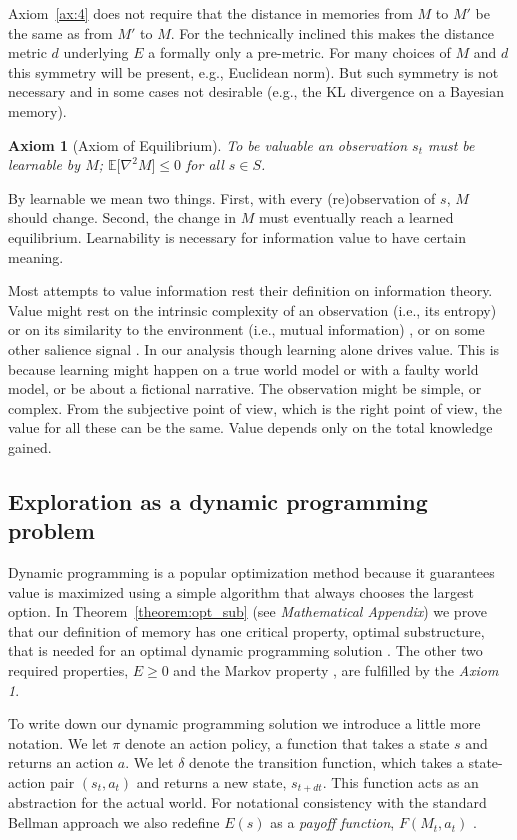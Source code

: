 \documentclass[fleqn,10pt]{wlscirep}
\newtheorem{axiom}{Axiom}
\begin{document}
Axiom~\ref{ax:4} does not require that the distance in memories from $M$ to $M'$ be the same as from $M'$ to $M$. For the technically inclined this makes the distance metric $d$ underlying $E$ a formally only a pre-metric. For many choices of $M$ and $d$ this symmetry will be present, e.g., Euclidean norm). But such symmetry is not necessary and in some cases not desirable (e.g., the KL divergence on a Bayesian memory).

\begin{axiom}
	[Axiom of Equilibrium] To be valuable an observation $s_t$ must be learnable by $M$; $\mathbb{E}\big [\nabla^2 M \big ] \leq 0$ for all $s \in S$. 
\label{ax:5} 
\end{axiom}
\noindent By learnable we mean two things. First, with every (re)observation of $s$, $M$ should change. Second, the change in $M$ must eventually reach a learned equilibrium. Learnability is necessary for information value to have certain meaning. 

Most attempts to value information rest their definition on information theory. Value might rest on the intrinsic complexity of an observation (i.e., its entropy) \cite{Haarnoja2018} or on its similarity to the environment (i.e., mutual information) \cite{Kolchinsky2018}, or on some other salience signal \cite{Tishby2000}. In our analysis though learning alone drives value. This is because learning might happen on a true world model or with a faulty world model, or be about a fictional narrative. The observation might be simple, or complex. From the subjective point of view, which is the right point of view, the value for all these can be the same. Value depends only on the total knowledge gained.

\subsection*{Exploration as a dynamic programming problem} Dynamic programming is a popular optimization method because it guarantees value is maximized using a simple algorithm that always chooses the largest option. In Theorem~\ref{theorem:opt_sub} (see \textit{Mathematical Appendix}) we prove that our definition of memory has one critical property, optimal substructure, that is needed for an optimal dynamic programming solution \cite{Bellmann1954,Roughgarden2019}. The other two required properties, $E \ge 0$ and the Markov property \cite{Bellmann1954,Roughgarden2019}, are fulfilled by the \textit{Axiom 1}. 

To write down our dynamic programming solution we introduce a little more notation. We let $\pi$ denote an action policy, a function that takes a state $s$ and returns an action $a$. We let $\delta$ denote the transition function, which takes a state-action pair $(s_{t},a_t)$ and returns a new state, $s_{t+dt}$. This function acts as an abstraction for the actual world. For notational consistency with the standard Bellman approach we also redefine $E(s)$ as a \textit{payoff function}, $F(M_{t}, a_t)$ \cite{Bellmann1954}.
 
\end{document}
